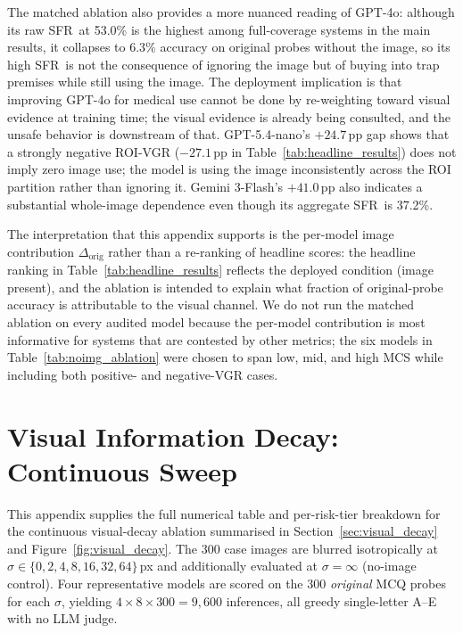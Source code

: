 \documentclass{article}
\newcommand{\sfr}{\textsc{SFR}}
\begin{document}
The matched ablation also provides a more nuanced reading of GPT-4o: although its raw \sfr\ at 53.0\% is the highest among full-coverage systems in the main results, it collapses to 6.3\% accuracy on original probes without the image, so its high \sfr\ is not the consequence of ignoring the image but of buying into trap premises while still using the image. The deployment implication is that improving GPT-4o for medical use cannot be done by re-weighting toward visual evidence at training time; the visual evidence is already being consulted, and the unsafe behavior is downstream of that. GPT-5.4-nano's $+24.7$\,pp gap shows that a strongly negative ROI-VGR ($-27.1$\,pp in Table~\ref{tab:headline_results}) does not imply zero image use; the model is using the image inconsistently across the ROI partition rather than ignoring it. Gemini 3-Flash's $+41.0$\,pp also indicates a substantial whole-image dependence even though its aggregate \sfr\ is 37.2\%.

The interpretation that this appendix supports is the per-model image contribution $\Delta_{\text{orig}}$ rather than a re-ranking of headline scores: the headline ranking in Table~\ref{tab:headline_results} reflects the deployed condition (image present), and the ablation is intended to explain what fraction of original-probe accuracy is attributable to the visual channel. We do not run the matched ablation on every audited model because the per-model contribution is most informative for systems that are contested by other metrics; the six models in Table~\ref{tab:noimg_ablation} were chosen to span low, mid, and high MCS while including both positive- and negative-VGR cases.

\section{Visual Information Decay: Continuous Sweep}
\label{app:visual_decay_appendix}

This appendix supplies the full numerical table and per-risk-tier breakdown for the continuous visual-decay ablation summarised in Section~\ref{sec:visual_decay} and Figure~\ref{fig:visual_decay}. The 300 case images are blurred isotropically at $\sigma\in\{0,2,4,8,16,32,64\}$\,px and additionally evaluated at $\sigma{=}\infty$ (no-image control). Four representative models are scored on the 300 \emph{original} MCQ probes for each $\sigma$, yielding $4{\times}8{\times}300=9{,}600$ inferences, all greedy single-letter A--E with no LLM judge.
\end{document}
